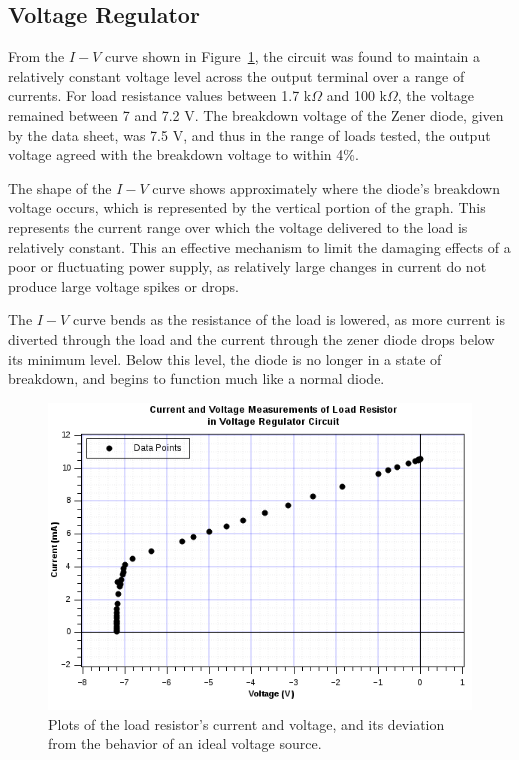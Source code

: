 \documentclass[twocolumn,english]{IEEEtran}
\begin{document}
\noindent\hrulefill
\subsection{\textbf{Voltage Regulator}}
From the $I-V$ curve shown in Figure~\ref{fig:voltage_reg}, the circuit was found to maintain a relatively constant voltage level across the output terminal over a range of currents. For load resistance values between 1.7 k$\Omega$ and 100 k$\Omega$, the voltage remained between 7 and 7.2 V. The breakdown voltage of the Zener diode, given by the data sheet, was 7.5 V, and thus in the range of loads tested, the output voltage agreed with the breakdown voltage to within 4\%.

The shape of the $I-V$ curve shows approximately where the diode's breakdown voltage occurs, which is represented by the vertical portion of the graph. This represents the current range over which the voltage delivered to the load is relatively constant. This an effective mechanism to limit the damaging effects of a poor or fluctuating power supply, as relatively large changes in current do not produce large voltage spikes or drops.

The $I-V$ curve bends as the resistance of the load is lowered, as more current is diverted through the load and the current through the zener diode drops below its minimum level. Below this level, the diode is no longer in a state of breakdown, and begins to function much like a normal diode.

\begin{figure}[H]
  \begin{centering}
  \begin{center}
  \includegraphics[width=\linewidth]{./Images/voltage_reg.png}
  \caption{Plots of the load resistor's current and voltage, and its deviation from the behavior of an ideal voltage source.}
  \label{fig:voltage_reg}
  \end{center}
  \par\end{centering}
\end{figure}
\end{document}
